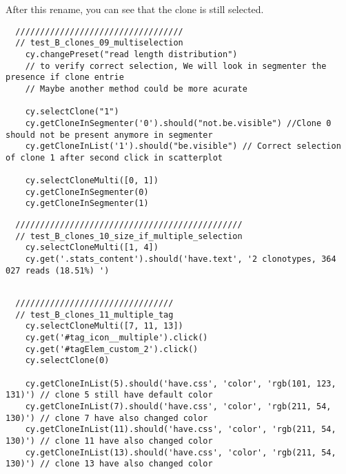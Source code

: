After this rename, you can see that the clone is still selected.
\begin{verbatim}
  //////////////////////////////////
  // test_B_clones_09_multiselection
    cy.changePreset("read length distribution")
    // to verify correct selection, We will look in segmenter the presence if clone entrie
    // Maybe another method could be more acurate

    cy.selectClone("1")
    cy.getCloneInSegmenter('0').should("not.be.visible") //Clone 0 should not be present anymore in segmenter
    cy.getCloneInList('1').should("be.visible") // Correct selection of clone 1 after second click in scatterplot

    cy.selectCloneMulti([0, 1])
    cy.getCloneInSegmenter(0)
    cy.getCloneInSegmenter(1)

\end{verbatim}

\begin{verbatim}
  //////////////////////////////////////////////
  // test_B_clones_10_size_if_multiple_selection
    cy.selectCloneMulti([1, 4])
    cy.get('.stats_content').should('have.text', '2 clonotypes, 364 027 reads (18.51%) ')


\end{verbatim}

\begin{verbatim}
  ////////////////////////////////
  // test_B_clones_11_multiple_tag
    cy.selectCloneMulti([7, 11, 13])
    cy.get('#tag_icon__multiple').click()
    cy.get('#tagElem_custom_2').click()
    cy.selectClone(0)

    cy.getCloneInList(5).should('have.css', 'color', 'rgb(101, 123, 131)') // clone 5 still have default color
    cy.getCloneInList(7).should('have.css', 'color', 'rgb(211, 54, 130)') // clone 7 have also changed color
    cy.getCloneInList(11).should('have.css', 'color', 'rgb(211, 54, 130)') // clone 11 have also changed color
    cy.getCloneInList(13).should('have.css', 'color', 'rgb(211, 54, 130)') // clone 13 have also changed color


\end{verbatim}

